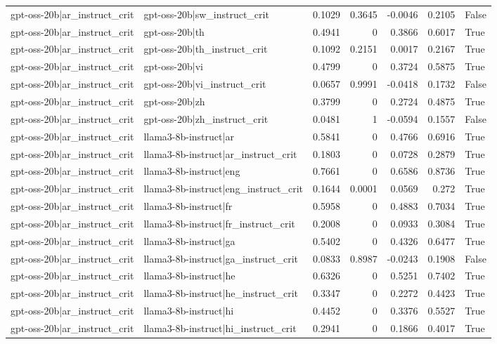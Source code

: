 \begin{table}
\begin{tabular}{l l r r r r l}
gpt-oss-20b|ar_instruct_crit & gpt-oss-20b|sw_instruct_crit & 0.1029 & 0.3645 & -0.0046 & 0.2105 & False \\
gpt-oss-20b|ar_instruct_crit & gpt-oss-20b|th & 0.4941 & 0 & 0.3866 & 0.6017 & True \\
gpt-oss-20b|ar_instruct_crit & gpt-oss-20b|th_instruct_crit & 0.1092 & 0.2151 & 0.0017 & 0.2167 & True \\
gpt-oss-20b|ar_instruct_crit & gpt-oss-20b|vi & 0.4799 & 0 & 0.3724 & 0.5875 & True \\
gpt-oss-20b|ar_instruct_crit & gpt-oss-20b|vi_instruct_crit & 0.0657 & 0.9991 & -0.0418 & 0.1732 & False \\
gpt-oss-20b|ar_instruct_crit & gpt-oss-20b|zh & 0.3799 & 0 & 0.2724 & 0.4875 & True \\
gpt-oss-20b|ar_instruct_crit & gpt-oss-20b|zh_instruct_crit & 0.0481 & 1 & -0.0594 & 0.1557 & False \\
gpt-oss-20b|ar_instruct_crit & llama3-8b-instruct|ar & 0.5841 & 0 & 0.4766 & 0.6916 & True \\
gpt-oss-20b|ar_instruct_crit & llama3-8b-instruct|ar_instruct_crit & 0.1803 & 0 & 0.0728 & 0.2879 & True \\
gpt-oss-20b|ar_instruct_crit & llama3-8b-instruct|eng & 0.7661 & 0 & 0.6586 & 0.8736 & True \\
gpt-oss-20b|ar_instruct_crit & llama3-8b-instruct|eng_instruct_crit & 0.1644 & 0.0001 & 0.0569 & 0.272 & True \\
gpt-oss-20b|ar_instruct_crit & llama3-8b-instruct|fr & 0.5958 & 0 & 0.4883 & 0.7034 & True \\
gpt-oss-20b|ar_instruct_crit & llama3-8b-instruct|fr_instruct_crit & 0.2008 & 0 & 0.0933 & 0.3084 & True \\
gpt-oss-20b|ar_instruct_crit & llama3-8b-instruct|ga & 0.5402 & 0 & 0.4326 & 0.6477 & True \\
gpt-oss-20b|ar_instruct_crit & llama3-8b-instruct|ga_instruct_crit & 0.0833 & 0.8987 & -0.0243 & 0.1908 & False \\
gpt-oss-20b|ar_instruct_crit & llama3-8b-instruct|he & 0.6326 & 0 & 0.5251 & 0.7402 & True \\
gpt-oss-20b|ar_instruct_crit & llama3-8b-instruct|he_instruct_crit & 0.3347 & 0 & 0.2272 & 0.4423 & True \\
gpt-oss-20b|ar_instruct_crit & llama3-8b-instruct|hi & 0.4452 & 0 & 0.3376 & 0.5527 & True \\
gpt-oss-20b|ar_instruct_crit & llama3-8b-instruct|hi_instruct_crit & 0.2941 & 0 & 0.1866 & 0.4017 & True \\

\end{tabular}
\end{table}
